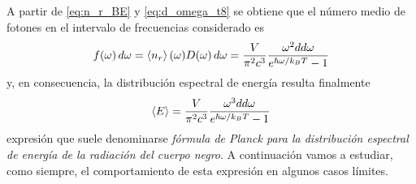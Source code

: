 A partir de \eqref{eq:n_r_BE} y \eqref{eq:d_omega_t8} se obtiene que el número medio de fotones en el intervalo de frecuencias considerado es
\begin{equation}\label{eq:f_omega_t8}
	f(\omega) \dd{\omega} = \expval{n_r}(\omega) D(\omega) \dd{\omega} = \frac{V}{\pi^2 c^3}\frac{\omega^2 dd{\omega}}{e^{\hbar\omega / k_BT} - 1}
\end{equation}
y, en consecuencia, la distribución espectral de energía resulta finalmente
\begin{equation}\label{eq:E_med_t8}
	\expval{E} = \frac{V}{\pi^2 c^3}\frac{\omega^3 dd{\omega}}{e^{\hbar\omega / k_BT} - 1}
\end{equation}
expresión que suele denominarse \emph{fórmula de Planck para la distribución espectral de energía de la radiación del cuerpo negro}.
A continuación vamos a estudiar, como siempre, el comportamiento de esta expresión en algunos casos límites.